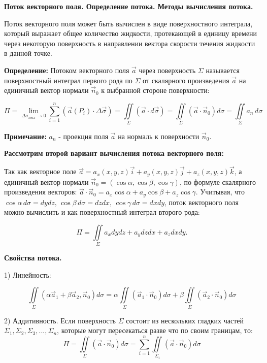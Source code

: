 
\begin{center}
\textbf{Поток векторного поля. Определение потока. Методы вычисления потока.}
\end{center}

Поток векторного поля может быть вычислен в виде поверхностного интеграла, который выражает общее количество жидкости, протекающей в единицу времени через некоторую поверхность в направлении вектора скорости течения жидкости в данной точке. 

\par\bigskip

\textbf{Определение:} Потоком векторного поля  $\vec{a}$ через поверхность $\Sigma$ называется поверхностный интеграл первого рода по $\Sigma$ от скалярного произведения $\vec{a}$ на единичный вектор нормали $\vec{n}_0$ к выбранной стороне поверхности: 

$$\Pi= \lim_{\Delta\sigma_{max}\rightarrow 0} \sum_{i=1}^{n}(\vec{a}(P_i)\cdot\Delta\vec{\sigma}) = \iint\limits_\Sigma(\vec{a}\cdot
d\vec{\sigma})=\iint\limits_\Sigma(\vec{a}\cdot
\vec{n}_0) d\sigma = \iint\limits_\Sigma a_n\, d \sigma$$

\textbf{Примечание:} $a_n$ - проекция поля $\vec{a}$ на нормаль к поверхности $\vec{n}_0$.

\par\bigskip
\textbf{Рассмотрим второй вариант вычисления потока векторного поля:} 

Так как векторное поле $\vec{a}=a_x(x,y,z)\vec{i}+a_y(x,y,z)\vec{j}+a_z(x,y,z)\vec{k}$, а единичный вектор нормали $\vec{n}_0 = (\cos{\alpha}, \cos{\beta}, \cos{\gamma})$,  по формуле скалярного произведения векторов: $\vec{a}\cdot \vec{n}_0 = a_x\cos{\alpha} + a_y\cos{\beta} + a_z\cos{\gamma}$.
Учитывая, что $\cos{\alpha}\, d\sigma = dydz, \, \cos{\beta}\, d\sigma = dzdx, \, \cos{\gamma}\, d\sigma = dxdy$, поток векторного поля можно вычислить и как поверхностный интеграл второго рода:

$$\Pi=\iint\limits_\Sigma a_x dydz + a_y dzdx + a_z dxdy.$$

\begin{center}
	\textbf{Свойства потока.}
\end{center}

1) Линейность:

$$\iint\limits_\Sigma(\alpha \vec{a}_1 + \beta \vec{a}_2, \vec{n}_0)d\sigma = \alpha\iint\limits_\Sigma(\vec{a}_1\cdot
\vec{n}_0) d\sigma + \beta\iint\limits_\Sigma(\vec{a}_2\cdot
\vec{n}_0) d\sigma  $$

2) Аддитивность. Если поверхность $\Sigma$ состоит из нескольких гладких частей $\Sigma_1, \Sigma_2, \Sigma_3, ..., \Sigma_n$, которые могут пересекаться разве что по своим границам, то:
 $$\Pi=\iint\limits_\Sigma(\vec{a}\cdot\vec{n}_0) d\sigma = \sum_{i=1}^{n} \iint\limits_{\Sigma_{i}} (\vec{a}\cdot\vec{n}_0 )d\sigma$$
  

